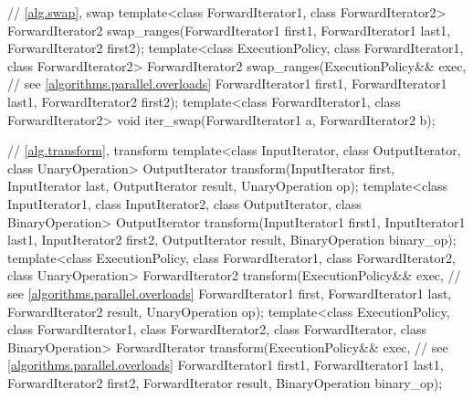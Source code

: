 \begin{codeblock}
{  // \ref{alg.swap}, swap
  template<class ForwardIterator1, class ForwardIterator2>
    ForwardIterator2 swap_ranges(ForwardIterator1 first1, ForwardIterator1 last1,
                                 ForwardIterator2 first2);
  template<class ExecutionPolicy, class ForwardIterator1, class ForwardIterator2>
    ForwardIterator2 swap_ranges(ExecutionPolicy&& exec, // see \ref{algorithms.parallel.overloads}
                                 ForwardIterator1 first1, ForwardIterator1 last1,
                                 ForwardIterator2 first2);
  template<class ForwardIterator1, class ForwardIterator2>
    void iter_swap(ForwardIterator1 a, ForwardIterator2 b);

  // \ref{alg.transform}, transform
  template<class InputIterator, class OutputIterator, class UnaryOperation>
    OutputIterator transform(InputIterator first, InputIterator last,
                             OutputIterator result, UnaryOperation op);
  template<class InputIterator1, class InputIterator2, class OutputIterator,
           class BinaryOperation>
    OutputIterator transform(InputIterator1 first1, InputIterator1 last1,
                             InputIterator2 first2, OutputIterator result,
                             BinaryOperation binary_op);
  template<class ExecutionPolicy, class ForwardIterator1, class ForwardIterator2,
           class UnaryOperation>
    ForwardIterator2 transform(ExecutionPolicy&& exec, // see \ref{algorithms.parallel.overloads}
                               ForwardIterator1 first, ForwardIterator1 last,
                               ForwardIterator2 result, UnaryOperation op);
  template<class ExecutionPolicy, class ForwardIterator1, class ForwardIterator2,
           class ForwardIterator, class BinaryOperation>
    ForwardIterator transform(ExecutionPolicy&& exec, // see \ref{algorithms.parallel.overloads}
                              ForwardIterator1 first1, ForwardIterator1 last1,
                              ForwardIterator2 first2, ForwardIterator result,
                              BinaryOperation binary_op);

}
\end{codeblock}
